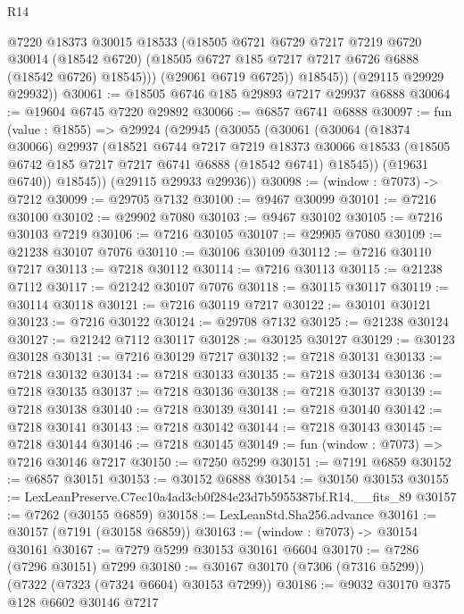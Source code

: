 \begin{lexlean}{R14}
\begin{coremodule}
              @7220
              @18373
              @30015
              @18533
              (@18505
                @6721
                @6729
                @7217
                @7219
                @6720
                @30014
                (@18542 @6720)
                (@18505 @6727 @185 @7217 @7217 @6726 @6888 (@18542 @6726) @18545)))
            (@29061 @6719 @6725))
          @18545))
      (@29115 @29929 @29932))
@30061 := @18505 @6746 @185 @29893 @7217 @29937 @6888
@30064 := @19604 @6745 @7220 @29892
@30066 := @6857 @6741 @6888
@30097 := fun (value : @1855) =>
  @29924
    (@29945
      (@30055
        (@30061
          (@30064
            (@18374 @30066)
            @29937
            (@18521
              @6744
              @7217
              @7219
              @18373
              @30066
              @18533
              (@18505 @6742 @185 @7217 @7217 @6741 @6888 (@18542 @6741) @18545))
            (@19631 @6740))
          @18545))
      (@29115 @29933 @29936))
@30098 := (window : @7073) -> @7212
@30099 := @29705 @7132
@30100 := @9467 @30099
@30101 := @7216 @30100
@30102 := @29902 @7080
@30103 := @9467 @30102
@30105 := @7216 @30103 @7219
@30106 := @7216 @30105
@30107 := @29905 @7080
@30109 := @21238 @30107 @7076
@30110 := @30106 @30109
@30112 := @7216 @30110 @7217
@30113 := @7218 @30112
@30114 := @7216 @30113
@30115 := @21238 @7112
@30117 := @21242 @30107 @7076
@30118 := @30115 @30117
@30119 := @30114 @30118
@30121 := @7216 @30119 @7217
@30122 := @30101 @30121
@30123 := @7216 @30122
@30124 := @29708 @7132
@30125 := @21238 @30124
@30127 := @21242 @7112 @30117
@30128 := @30125 @30127
@30129 := @30123 @30128
@30131 := @7216 @30129 @7217
@30132 := @7218 @30131
@30133 := @7218 @30132
@30134 := @7218 @30133
@30135 := @7218 @30134
@30136 := @7218 @30135
@30137 := @7218 @30136
@30138 := @7218 @30137
@30139 := @7218 @30138
@30140 := @7218 @30139
@30141 := @7218 @30140
@30142 := @7218 @30141
@30143 := @7218 @30142
@30144 := @7218 @30143
@30145 := @7218 @30144
@30146 := @7218 @30145
@30149 := fun (window : @7073) => @7216 @30146 @7217
@30150 := @7250 @5299
@30151 := @7191 @6859
@30152 := @6857 @30151
@30153 := @30152 @6888
@30154 := @30150 @30153
@30155 := LexLeanPreserve.C7ec10a4ad3cb0f284e23d7b5955387bf.R14.__fits_89
@30157 := @7262 (@30155 @6859)
@30158 := LexLeanStd.Sha256.advance
@30161 := @30157 (@7191 (@30158 @6859))
@30163 := (window : @7073) -> @30154 @30161
@30167 := @7279 @5299 @30153 @30161 @6604
@30170 := @7286 (@7296 @30151) @7299
@30180 := @30167 @30170 (@7306 (@7316 @5299)) (@7322 (@7323 (@7324 @6604) @30153 @7299))
@30186 := @9032 @30170 @375 @128 @6602 @30146 @7217

\end{coremodule}
\end{lexlean}
